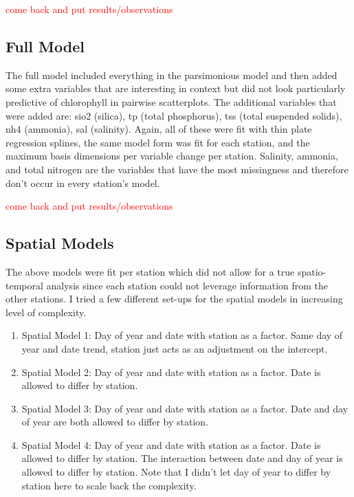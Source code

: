 \documentclass[12pt]{amsart}
\begin{document}
\textcolor{red}{come back and put results/observations}


\subsection{Full Model}

The full model included everything in the parsimonious model and then added some extra variables that are interesting in context but did not look particularly predictive of chlorophyll in pairwise scatterplots. The additional variables that were added are: sio2 (silica), tp (total phosphorus), tss (total suspended solids), nh4 (ammonia), sal (salinity). Again, all of these were fit with thin plate regression splines, the same model form was fit for each station, and the maximum basis dimensions per variable change per station.  Salinity, ammonia, and total nitrogen are the variables that have the most missingness and therefore don't occur in every station's model.

\textcolor{red}{come back and put results/observations}



\subsection{Spatial Models}

The above models were fit per station which did not allow for a true spatio-temporal analysis since each station could not leverage information from the other stations. I tried a few different set-ups for the spatial models in increasing level of complexity.

\begin{enumerate}
\item Spatial Model 1: Day of year and date with station as a factor. Same day of year and date trend, station just acts as an adjustment on the intercept.
\item Spatial Model 2: Day of year and date with station as a factor. Date is allowed to differ by station.
\item Spatial Model 3: Day of year and date with station as a factor. Date and day of year are both allowed to differ by station.
\item Spatial Model 4:  Day of year and date with station as a factor. Date is allowed to differ by station. The interaction between date and day of year is allowed to differ by station. Note that I didn't let day of year to differ by station here to scale back the complexity.
\end{enumerate}
\end{document}
